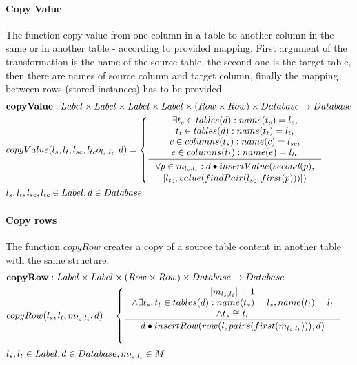 \documentclass[11pt]{article}
\begin{document}
\paragraph{Copy Value} The function copy value from one column in a table to another column in the same or in another table - according to provided mapping. First argument of the transformation is the name of the source table, the second one is the target table, then there are names of source column and target column, finally the mapping between rows (stored instances) has to be provided.
\begin{align*}
&	\mathbf{copyValue} : Label \times Label \times Label \times Label \times (Row \times Row) \times Database \rightarrow Database \\
&	copyValue(l_s, l_t, l_{sc}, l_{tc} o_{l_s, l_t}, d) = \begin{cases}
		\inference{\exists t_s \in tables(d) : name(t_s) = l_s, \\ t_t \in tables(d) : name(t_t) = l_t, \\ c \in columns(t_s) : name(c) = l_{sc}, \\ e \in columns(t_t) : name(e) = l_{tc}}{\begin{gathered}
		\forall	p \in m_{l_s, l_t} :	d \bullet insertValue(second(p), \\ [l_{tc},value(findPair(l_{sc}, first(p)))])
		\end{gathered}}
 	\end{cases} \\
& 	l_s, l_t, l_{sc}, l_{tc} \in Label, d \in Database
\end{align*}

\paragraph{Copy rows} The function $copyRow$ creates a copy of a source table content in another table with the same structure. 
\begin{align*}
&	\mathbf{copyRow} : Label \times Label \times (Row \times Row) \times Database \rightarrow Database \\
&	copyRow(l_s, l_t, m_{l_s, l_t}, d) = \begin{cases}
 	\inference{|m_{l_s, l_t}| = 1 \\ \wedge \exists t_s, t_t \in tables(d) : name(t_s) = l_s, name(t_t) = l_t \\ \wedge t_s \cong t_t }{d \bullet insertRow(row(l, pairs(first(m_{l_s, l_t}))), d)} \\\\
  \end{cases} \\
&  l_s, l_t \in Label, d \in Database, m_{l_s, l_t} \in M
\end{align*}
\end{document}
